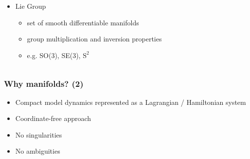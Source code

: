 \begin{frame}
\begin{columns}
\begin{column}{0.6\textwidth}
		\begin{itemize}
			\item Lie Group
			\begin{itemize}
				\item set of smooth differentiable manifolds
				\item group multiplication and inversion properties
				\item e.g. SO(3), SE(3), $\text{S}^2$
			\end{itemize}
		\end{itemize}
	\end{column}
	\end{columns}
\end{frame}

\begin{frame}
	\frametitle{Why manifolds? (2)}
	
	\begin{itemize}
		\item Compact model dynamics represented as a Lagrangian / Hamiltonian system
		\item Coordinate-free approach
		\item No singularities
		\item No ambiguities
	\end{itemize}
\end{frame}